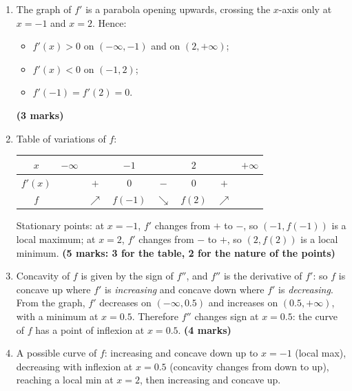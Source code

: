 \documentclass[11pt]{article}
\newcommand{\cle}[1]{{\popxbold\color{popdark}#1}}
\begin{document}
\begin{corrige}
\begin{enumerate}
\item The graph of $f'$ is a parabola opening upwards, crossing the $x$-axis only at $x=-1$ and $x=2$. Hence:
\begin{itemize}
\item $f'(x)>0$ on $(-\infty,-1)$ and on $(2,+\infty)$;
\item $f'(x)<0$ on $(-1,2)$;
\item $f'(-1)=f'(2)=0$.
\end{itemize}
\hfill \textbf{(3 marks)}
\item Table of variations of $f$:
\begin{center}
\begin{tabular}{|c|ccccccc|}
\hline
$x$ & $-\infty$ & & $-1$ & & $2$ & & $+\infty$ \\
\hline
$f'(x)$ & & $+$ & $0$ & $-$ & $0$ & $+$ & \\
\hline
$f$ & & $\nearrow$ & $f(-1)$ & $\searrow$ & $f(2)$ & $\nearrow$ & \\
\hline
\end{tabular}
\end{center}
Stationary points: at $x=-1$, $f'$ changes from $+$ to $-$, so $(-1,f(-1))$ is a \cle{local maximum}; at $x=2$, $f'$ changes from $-$ to $+$, so $(2,f(2))$ is a \cle{local minimum}. \hfill \textbf{(5 marks: 3 for the table, 2 for the nature of the points)}
\item Concavity of $f$ is given by the sign of $f''$, and $f''$ is the derivative of $f'$: so $f$ is concave up where $f'$ is \emph{increasing} and concave down where $f'$ is \emph{decreasing}. From the graph, $f'$ decreases on $(-\infty,0.5)$ and increases on $(0.5,+\infty)$, with a minimum at $x=0.5$. Therefore $f''$ changes sign at $x=0.5$: the curve of $f$ has a \cle{point of inflexion} at $x=0.5$. \hfill \textbf{(4 marks)}
\item A possible curve of $f$: increasing and concave down up to $x=-1$ (local max), decreasing with inflexion at $x=0.5$ (concavity changes from down to up), reaching a local min at $x=2$, then increasing and concave up.
\begin{popfigure}
\end{popfigure}
\end{enumerate}
\end{corrige}
\end{document}
